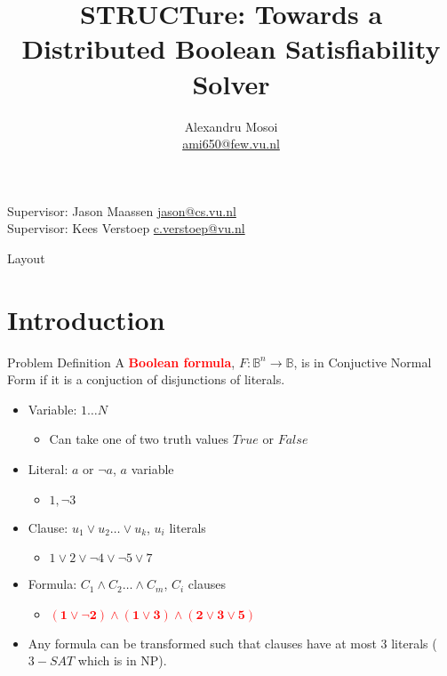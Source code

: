 \documentclass[mathserif,serif]{beamer}
\begin{document}
\title{STRUCTure: Towards a Distributed Boolean Satisfiability Solver}
\author{Alexandru Mosoi \\
        \url{ami650@few.vu.nl}}


\begin{frame}
  \titlepage

  \begin{flushright}
    Supervisor: Jason Maassen \url{jason@cs.vu.nl} \\
    Supervisor: Kees Verstoep \url{c.verstoep@vu.nl} 
  \end{flushright}
\end{frame}

\begin{frame}{Layout}
  \tableofcontents
\end{frame}

\section{Introduction}

\begin{frame}{Problem Definition}
  A \textcolor{red}{\textbf{Boolean formula}}, $F : \mathbb{B}^n \rightarrow
  \mathbb{B}$, is in Conjuctive Normal Form if
  it is a conjuction of disjunctions of literals.

  \begin{itemize}
    \item Variable: $1 \ldots N$
    \begin{itemize}
      \item Can take one of two truth values $True$ or $False$
    \end{itemize}
    \item Literal: $a$ or $\neg a$, $a$ variable
    \begin{itemize}
      \item $1, \neg 3$
    \end{itemize}
    \item Clause: $u_1 \lor u_2 \ldots \lor u_k$, $u_i$ literals
    \begin{itemize}
      \item $1 \lor 2 \lor \neg 4 \lor \neg 5 \lor 7$
    \end{itemize}
    \item Formula: $C_1 \land C_2 \ldots \land C_m$, $C_i$ clauses
    \begin{itemize}
      \item \textcolor{red}{$\mathbf{(1 \lor \neg 2) \land (1 \lor 3) \land (2 \lor 3 \lor 5)}$}
    \end{itemize}
    \item Any formula can be transformed such that clauses have at most 3
    literals ($3-SAT$ which is in NP).
  \end{itemize}
\end{frame}
\end{document}
